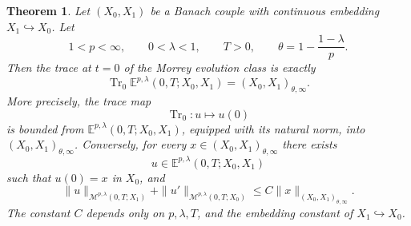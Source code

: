 \documentclass[10pt,a4paper]{amsart}
\newtheorem{theorem}{Theorem}
\begin{document}
\begin{theorem}\label{thm:exact-morrey-trace-space}
	Let \((X_0,X_1)\) be a Banach couple with continuous embedding \(X_1\hookrightarrow X_0\).  Let
	\[
	1<p<\infty,\qquad 0<\lambda<1,\qquad T>0,
	\qquad
	\theta=1-\frac{1-\lambda}{p}.
	\]
	Then the trace at \(t=0\) of the Morrey evolution class is exactly
	\[
	\operatorname{Tr}_{0}\mathbb E^{p,\lambda}(0,T;X_0,X_1)
	=
	(X_0,X_1)_{\theta,\infty}.
	\]
	More precisely, the trace map
	\[
	\operatorname{Tr}_{0}:u\mapsto u(0)
	\]
	is bounded from \(\mathbb E^{p,\lambda}(0,T;X_0,X_1)\), equipped with its natural norm, into \((X_0,X_1)_{\theta,\infty}\).  Conversely, for every \(x\in (X_0,X_1)_{\theta,\infty}\) there exists
	\[
	u\in \mathbb E^{p,\lambda}(0,T;X_0,X_1)
	\]
	such that \(u(0)=x\) in \(X_0\), and
	\[
	\|u\|_{\mathcal M^{p,\lambda}(0,T;X_1)}
	+
	\|u'\|_{\mathcal M^{p,\lambda}(0,T;X_0)}
	\le
	C\|x\|_{(X_0,X_1)_{\theta,\infty}}.
	\]
	The constant \(C\) depends only on \(p,\lambda,T\), and the embedding constant of \(X_1\hookrightarrow X_0\).
	\end{theorem}
\end{document}
